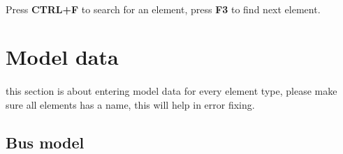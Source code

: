 \documentclass{article}
\begin{document}
\paragraph{} Press \textbf{CTRL+F} to search for an element, press \textbf{F3} to find next element.
\newpage
\section{Model data}
\label{sec:modeldata}
\paragraph{} this section is about entering model data for every element type, please make sure all elements has a name, this will help in error fixing. 
\subsection{Bus model}
\end{document}
